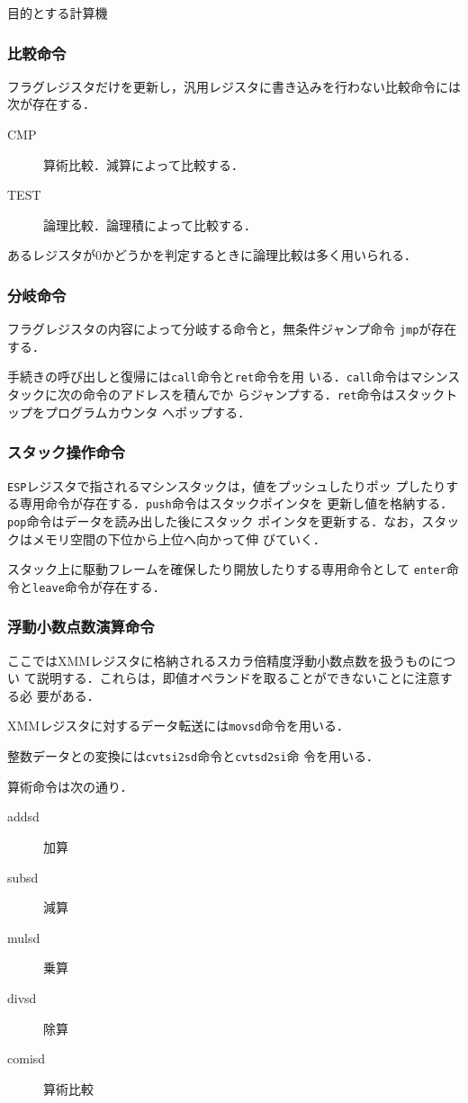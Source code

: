 \documentclass[a4paper,titlepage,report,disablejfam]{jsbook}
\begin{document}
\begin{resbonsiblesection}{目的とする計算機}{\kobori}
\subsubsection{比較命令}
フラグレジスタだけを更新し，汎用レジスタに書き込みを行わない比較命令には
次が存在する．
\begin{description}
 \item[CMP] 算術比較．減算によって比較する．
 \item[TEST] 論理比較．論理積によって比較する．
\end{description}
あるレジスタが0かどうかを判定するときに論理比較は多く用いられる．

\subsubsection{分岐命令}
フラグレジスタの内容によって分岐する命令と，無条件ジャンプ命令
\lstinline|jmp|が存在する．

手続きの呼び出しと復帰には\lstinline|call|命令と\lstinline|ret|命令を用
いる．\lstinline|call|命令はマシンスタックに次の命令のアドレスを積んでか
らジャンプする．\lstinline|ret|命令はスタックトップをプログラムカウンタ
へポップする．

\subsubsection{スタック操作命令}
\lstinline|ESP|レジスタで指されるマシンスタックは，値をプッシュしたりポッ
プしたりする専用命令が存在する．\lstinline|push|命令はスタックポインタを
更新し値を格納する．\lstinline|pop|命令はデータを読み出した後にスタック
ポインタを更新する．なお，スタックはメモリ空間の下位から上位へ向かって伸
びていく．

スタック上に駆動フレームを確保したり開放したりする専用命令として
\lstinline|enter|命令と\lstinline|leave|命令が存在する．

\subsubsection{浮動小数点数演算命令}
ここではXMMレジスタに格納されるスカラ倍精度浮動小数点数を扱うものについ
て説明する．これらは，即値オペランドを取ることができないことに注意する必
要がある．

XMMレジスタに対するデータ転送には\lstinline|movsd|命令を用いる．

整数データとの変換には\lstinline|cvtsi2sd|命令と\lstinline|cvtsd2si|命
令を用いる．

算術命令は次の通り．
\begin{description}
 \item[addsd] 加算
 \item[subsd] 減算
 \item[mulsd] 乗算
 \item[divsd] 除算
 \item[comisd] 算術比較
\end{description}


\end{resbonsiblesection}
\end{document}
